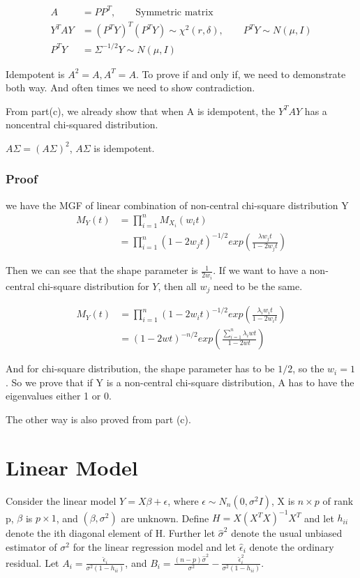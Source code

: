\documentclass[11pt]{article} %
\begin{document}
\begin{align*}
	A & = P P^T, \qquad \text{Symmetric matrix}\\
	Y^T A Y &=  (P^T Y)^T (P^T Y) \sim \chi^2(r, \delta), \qquad P^T Y \sim N(\mu, I)\\
	P^T Y &= \Sigma^{-1/2} Y \sim N(\mu, I)
\end{align*}


Idempotent is $A^2 = A, A^T = A$. 
To prove if and only if, we need to demonstrate both way. And often times we need to show contradiction.

From part(c), we already show that when A is idempotent, the $Y^T A Y$ has a noncentral chi-squared distribution. 

$A \Sigma = (A \Sigma)^2$, $A \Sigma$ is idempotent. 

\subsubsection{Proof}

we have the MGF of linear combination of non-central chi-square distribution Y
\begin{align*}
	M_Y(t) &= \prod_{i=1}^n M_{X_i}(w_i t)\\
	&=\prod_{i=1}^n  (1-2 w_jt)^{-1/2} exp \left( \frac{ \lambda w_j t }{1-2 w_j t} \right)
\end{align*}

Then we can see that the shape parameter is $\frac{1}{2 w_i}$. If we want to have a non-central chi-square distribution for $Y$, then all $w_j$ need to be the same. 

\begin{align*}
	M_Y(t) &= \prod_{i=1}^n  (1-2 w_i t)^{-1/2} exp \left( \frac{ \lambda_i w_i t }{1-2 w_i t} \right) \\
	&= (1-2 wt)^{-n/2} exp \left( \frac{ \sum_{i=1}^n\lambda_i w t }{1-2 w t} \right) 
\end{align*}

And for chi-square distribution, the shape parameter has to be $1/2$, so the $w_i = 1$. So we prove that if Y is a non-central chi-square distribution, A has to have the eigenvalues either 1 or 0. 

The other way is also proved from part (c). 


\section{Linear Model}
Consider the linear model $Y = X \beta + \epsilon$, where $\epsilon \sim N_n(0, \sigma^2 I)$, X is $n \times p$ of rank p, $\beta$ is $p \times 1$, and $(\beta, \sigma^2)$ are unknown. Define $H = X(X^TX)^{-1}X^T$ and let $h_{ii}$ denote the ith diagonal element of H. Further let $\hat{\sigma}^2$ denote the usual unbiased estimator of $\sigma^2$ for the linear regression model and let $\hat{\epsilon}_i$ denote the ordinary residual. Let $A_i = \frac{\hat{\epsilon}_i}{\sigma^2(1-h_{ii})}$, and $B_i = \frac{(n-p)\hat{\sigma}^2 }{\sigma^2} - \frac{\hat{\epsilon}_i^2}{\sigma^2(1-h_{ii})}$.
\end{document}
